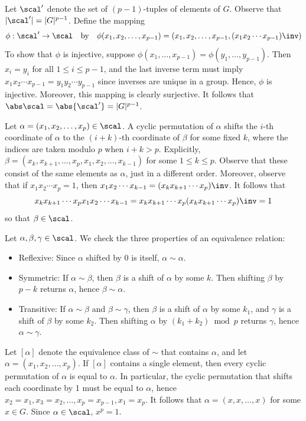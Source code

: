 \begin{solenum}[spsol]
    \item Let $\scal'$ denote the set of $(p - 1)$-tuples of elements of $G$.
	Observe that $|\scal'| = |G|^{p-1}$.
	Define the mapping
    \[
    	\phi : \scal' \to \scal \quad \text{by} \quad \phi(x_1, x_2, \dots, x_{p-1}) = (x_1, x_2, \dots, x_{p-1}, (x_1x_2 \cdots x_{p-1})\inv)
    \]
    To show that $\phi$ is injective, suppose $\phi(x_1, \dots, x_{p-1}) = \phi(y_1, \dots, y_{p-1})$.
	Then $x_i = y_i$ for all $1 \leq i \leq p - 1$, and the last inverse term must imply $x_1x_2 \cdots x_{p - 1} = y_1y_2 \cdots y_{p - 1}$ since inverses are unique in a group.
	Hence, $\phi$ is injective.
	Moreover, this mapping is clearly surjective.
	It follows that $\abs\scal = \abs{\scal'} = |G|^{p-1}$.
    \item Let $\alpha = (x_1, x_2, \dots, x_p) \in \scal$.
	A cyclic permutation of $\alpha$ shifts the $i$-th coordinate of $\alpha$ to the $(i + k)$-th coordinate of $\beta$ for some fixed $k$, where the indices are taken modulo $p$ when $i + k > p$.
	Explicitly, $\beta = (x_k, x_{k+1}, \dots, x_p, x_1, x_2, \dots, x_{k-1})$ for some $1 \leq k \leq p$.
	Observe that these consist of the same elements as $\alpha$, just in a different order.
	Moreover, observe that if $x_1x_2 \cdots x_p = 1$, then $x_1x_2 \cdots x_{k - 1} = (x_k x_{k + 1} \cdots x_p)\inv$.
	It follows that
    \[
    	x_k x_{k+1} \cdots x_p x_1 x_2 \cdots x_{k-1} = x_k x_{k + 1} \cdots x_p (x_k x_{k + 1} \cdots x_p)\inv = 1
    \]
    so that $\beta \in \scal$.
    \item Let $\alpha, \beta, \gamma \in \scal$.
	We check the three properties of an equivalence relation:
    \begin{itemize}
        \item Reflexive: Since $\alpha$ shifted by 0 is itself, $\alpha \sim \alpha$.
        \item Symmetric: If $\alpha \sim \beta$, then $\beta$ is a shift of $\alpha$ by some $k$.
	Then shifting $\beta$ by $p - k$ returns $\alpha$, hence $\beta \sim \alpha$.
        \item Transitive: If $\alpha \sim \beta$ and $\beta \sim \gamma$, then $\beta$ is a shift of $\alpha$ by some $k_1$, and $\gamma$ is a shift of $\beta$ by some $k_2$.
	Then shifting $\alpha$ by $(k_1 + k_2) \bmod p$ returns $\gamma$, hence $\alpha \sim \gamma$.
    \end{itemize}
    \rightimp Let $[\alpha]$ denote the equivalence class of $\sim$ that contains $\alpha$, and let $\alpha = (x_1, x_2, \dots, x_p)$.
	If $[\alpha]$ contains a single element, then every cyclic permutation of $\alpha$ is equal to $\alpha$.
	In particular, the cyclic permutation that shifts each coordinate by 1 must be equal to $\alpha$, hence $x_2 = x_1, x_3 = x_2, \dots, x_p = x_{p-1}, x_1 = x_p$.
	It follows that $\alpha = (x, x, \dots, x)$ for some $x \in G$.
	Since $\alpha \in \scal$, $x^p = 1$.
    

\end{solenum}
